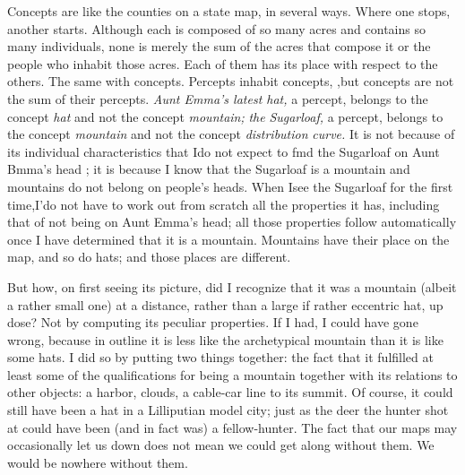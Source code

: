 Concepts are like the counties on a state map, in several ways. Where one stops, another starts. Although each is composed of so many acres and contains so many individuals, none is merely the sum of the acres that compose it or the people who inhabit those acres. Each of them has its place with respect to the others. The same with con\-cepts. Percepts inhabit concepts, ,but concepts are not the sum of their percepts. \textit{Aunt Emma's latest hat,} a percept, belongs to the concept \textit{hat} and not the concept \textit{mountain;} \textit{the} \textit{Sugarloaf,} a percept, belongs to the concept \textit{mountain }and not the concept \textit{distribution} \textit{curve.} It is not because of its individual characteristics that Ido not expect to fmd the Sugarloaf on Aunt Bmma's head ; it is because I know that the Sugarloaf is a mountain and mountains do not belong on people's heads. When Isee the Sugarloaf for the first time,I'do not have to work out from scratch all the properties it has, including that of not being on Aunt Emma's head; all those properties follow auto\-matically once I have determined that it is a mountain. Mountains have their place on the map, and so do hats; and those places are different.

But how, on first seeing its picture, did I recognize that it was a mountain (albeit a rather small one) at a distance, rather than a large if rather eccentric hat, up dose? Not by computing its peculiar proper\-ties. If I had, I could have gone wrong, because in outline it is less like the archetypical mountain than it is like some hats. I did so by putting two things together: the fact that it fulfilled at least some of the qualifications for being a mountain together with its relations to other objects: a harbor, clouds, a cable-car line to its summit. Of course, it could still have been a hat in a Lilliputian model city; just as the deer the hunter shot at could have been (and in fact was) a
fellow-hunter. The fact that our maps may occasionally let us down does not mean we could get along without them. We would be no\-where without them.

